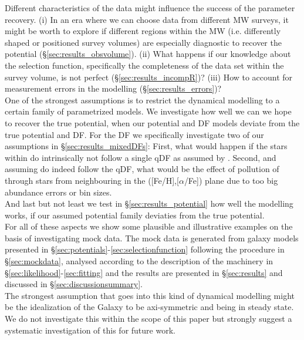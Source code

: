 Different characteristics of the data might influence the success of the parameter recovery. (i) In an era where we can choose data from different MW surveys, it might be worth to explore if different regions within the MW (i.e. differently shaped or positioned survey volumes) are especially diagnostic to recover the potential (\S\ref{sec:results_obsvolume}). (ii) What happens if our knowledge about the selection function, specifically the completeness of the data set within the survey volume, is not perfect (\S\ref{sec:results_incompR})? (iii) How to account for measurement errors in the modelling (\S\ref{sec:results_errors})? \\

One of the strongest assumptions is to restrict the dynamical modelling to a certain family of parametrized models. We investigate how well we can we hope to recover the true potential, when our potential and DF models deviate from the true potential and DF. For the DF we specifically investigate two of our assumptions in \S\ref{sec:results_mixedDFs}: First, what would happen if the stars within \MAPs{} do intrinsically not follow a single qDF as assumed by \citet{tin13,bov13}. Second, and assuming \MAPs{} do indeed follow the qDF, what would be the effect of pollution of \MAPs{} through stars from neighbouring \MAPs{} in the ([Fe/H],[$\alpha$/Fe]) plane due to too big abundance errors or bin sizes.\\
And last but not least we test in \S\ref{sec:results_potential} how well the modelling works, if our assumed potential family deviaties from the true potential. \\

For all of these aspects we show some plausible and illustrative examples on the basis of investigating mock data. The mock data is generated from galaxy models presented in \S\ref{sec:potentials}-\ref{sec:selectionfunction} following the procedure in \S\ref{sec:mockdata}, analysed according to the description of the machinery in \S\ref{sec:likelihood}-\ref{sec:fitting} and the results are presented in \S\ref{sec:results} and discussed in \S\ref{sec:discussionsummary}.\\

The strongest assumption that goes into this kind of dynamical modelling might be the idealization of the Galaxy to be axi-symmetric and being in steady state. We do not investigate this within the scope of this paper but strongly suggest a systematic investigation of this for future work.

